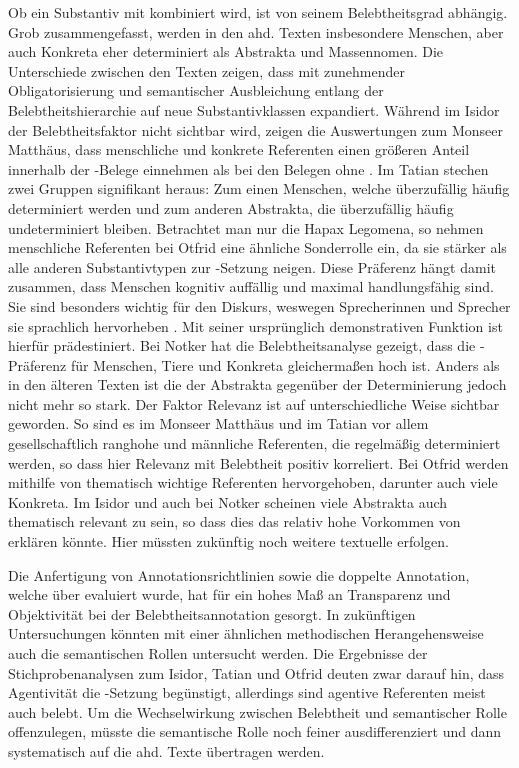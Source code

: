 Ob ein Substantiv mit  kombiniert wird, ist von seinem Belebtheitsgrad abhängig. Grob zusammengefasst, werden in den ahd. Texten insbesondere Menschen, aber auch Konkreta eher determiniert als Abstrakta und Massennomen. Die Unterschiede zwischen den Texten zeigen, dass  mit zunehmender Obligatorisierung und semantischer Ausbleichung entlang der Belebtheitshierarchie auf neue Substantivklassen expandiert. Während im Isidor der Belebtheitsfaktor nicht sichtbar wird, zeigen die Auswertungen zum Monseer Matthäus, dass menschliche und konkrete Referenten einen größeren Anteil innerhalb der -Belege einnehmen als bei den Belegen ohne . Im Tatian stechen zwei Gruppen signifikant heraus: Zum einen Menschen, welche überzufällig häufig determiniert werden und zum anderen Abstrakta, die überzufällig häufig undeterminiert bleiben. Betrachtet man nur die Hapax Legomena, so nehmen menschliche Referenten bei Otfrid eine ähnliche Sonderrolle ein, da sie stärker als alle anderen Substantivtypen zur -Setzung neigen. Diese Präferenz hängt damit zusammen, dass Menschen kognitiv auffällig und maximal handlungsfähig sind. Sie sind besonders wichtig für den Diskurs, weswegen Sprecherinnen und Sprecher sie sprachlich hervorheben . Mit seiner ursprünglich demonstrativen Funktion ist  hierfür prädestiniert.  
Bei Notker hat die Belebtheitsanalyse gezeigt, dass die  -Präferenz für Menschen, Tiere und Konkreta gleichermaßen hoch ist. Anders als in den älteren Texten ist die  der Abstrakta gegenüber der Determinierung jedoch nicht mehr so stark. Der Faktor Relevanz ist auf unterschiedliche Weise sichtbar geworden. So sind es im Monseer Matthäus und im Tatian vor allem gesellschaftlich ranghohe und männliche Referenten, die regelmäßig determiniert werden, so dass hier Relevanz mit Belebtheit positiv korreliert. Bei Otfrid werden mithilfe von  thematisch wichtige Referenten hervorgehoben, darunter auch viele Konkreta. Im Isidor und auch bei Notker scheinen viele Abstrakta auch thematisch relevant zu sein, so dass dies das relativ hohe Vorkommen von  erklären könnte. Hier müssten zukünftig noch weitere textuelle  erfolgen.

Die Anfertigung von Annotationsrichtlinien sowie die doppelte Annotation, welche über  evaluiert wurde, hat für ein hohes Maß an Transparenz und Objektivität bei der Belebtheitsannotation gesorgt. In zukünftigen Untersuchungen könnten mit einer ähnlichen methodischen Herangehensweise auch die semantischen Rollen untersucht werden. Die Ergebnisse der Stichprobenanalysen zum Isidor, Tatian und Otfrid deuten zwar darauf hin, dass Agentivität die -Setzung begünstigt, allerdings sind agentive Referenten meist auch belebt. Um die Wechselwirkung zwischen Belebtheit und semantischer Rolle offenzulegen, müsste die semantische Rolle noch feiner ausdifferenziert und dann systematisch auf die ahd. Texte übertragen werden. 

